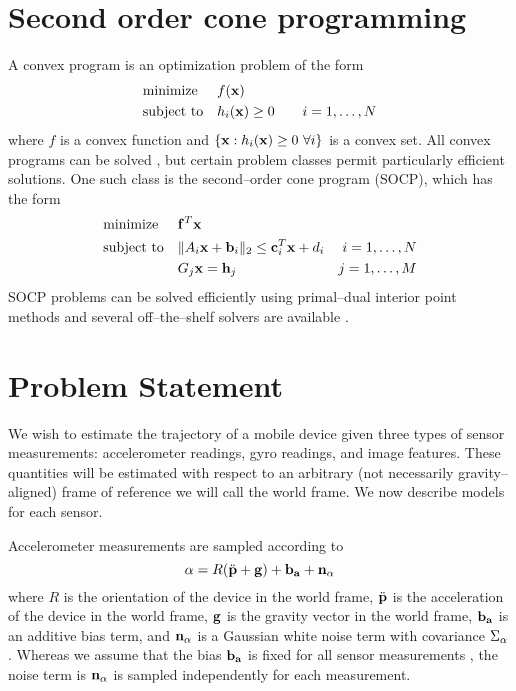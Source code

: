 \section{Second order cone programming}

A convex program is an optimization problem of the form
\begin{equation}
    \begin{aligned}
    & \text{minimize} & & f(\mathbf{x}) \\
    & \text{subject to} & & h_i(\mathbf{x}) \geq 0 ~~~~~~ i = 1,\ldots,N
  \end{aligned}
\end{equation}
where $f$ is a convex function and $\{\mathbf{x} : h_i(\mathbf{x}) \geq 0 ~\forall i\}$
is a convex set. All convex programs can be solved \cite{boyd}, but
certain problem classes permit particularly efficient solutions. One
such class is the second--order cone program (SOCP), which has the
form
\begin{equation}
  \begin{aligned}
    & \text{minimize} & & \vec{f}^T \Landmark & \\
    & \text{subject to} & & 
    \|A_i\Landmark+\vec{b}_i\|_2 \leq \vec{c}_i^T\Landmark + d_i & i =
    1,\ldots,N \\
    & & & G_j\Landmark = \vec{h}_j & j = 1,\ldots,M
  \end{aligned}
  \label{generic-socp}
\end{equation}
SOCP problems can be solved efficiently using primal--dual interior
point methods \cite{boyd} and several off--the--shelf solvers are
available \cite{mosek,cvxopt,cvx}.

\section{Problem Statement}

We wish to estimate the trajectory of a mobile device given three
types of sensor measurements: accelerometer readings, gyro readings,
and image features. These quantities will be estimated with respect to
an arbitrary (not necessarily gravity--aligned) frame of reference we
will call the world frame. We now describe models for each sensor.

Accelerometer measurements are sampled according to
\begin{equation}
  \mathbf{\alpha} = R (\ddot{\mathbf{p}} + \mathbf{g}) + \mathbf{b_a} + \mathbf{n_{\mathbf{\alpha}}}
\end{equation}
where $R$ is the orientation of the device in the world frame,
$\ddot{\mathbf{p}}$ is the acceleration of the device in the world frame,
$\mathbf{g}$ is the gravity vector in the world frame, $\mathbf{b_a}$ is an
additive bias term, and $\mathbf{n_{\mathbf{\alpha}}}$ is a Gaussian white noise term
with covariance $\Sigma_{\mathbf{\alpha}}$. Whereas we assume that the bias $\mathbf{b_a}$
is fixed for all sensor measurements \footnotemark, the noise term is
$\mathbf{n_{\mathbf{\alpha}}}$ is sampled independently for each measurement.

